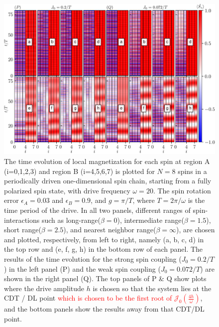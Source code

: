 \documentclass[12pt]{iopart}
\newcommand{\red}[1]{\textcolor{red}{#1}}
\begin{document}
\begin{figure}[t!]
    \centering
    \hspace{2cm}\includegraphics[width=13.5cm]{figure4.pdf}
    \caption{The time evolution of local magnetization for each spin at region A (i=0,1,2,3) and region B (i=4,5,6,7) is plotted for $N=8$ spins in a periodically driven one-dimensional spin chain, starting from a fully polarized spin state, with drive frequency $\omega=20$. The spin rotation error $\epsilon_A = 0.03$ and $\epsilon_B = 0.9$, and $g=\pi/T$, where $T=2\pi/\omega$ is the time period of the drive.  In all two panels, different ranges of spin-interactions such as long-range($\beta=0$), intermediate range($\beta=1.5$), short range($\beta=2.5$), and nearest neighbor range($\beta=\infty$), are chosen and plotted, respectively, from left to right, namely (a, b, c, d) in the top row and (e, f, g, h) in the bottom row of each panel. The results of the time evolution for the strong spin coupling ($J_0 = 0.2/T$) in the left panel (P) and the weak spin coupling ($J_0 = 0.072/T$) are shown in the right panel (Q). The top panels of P \& Q show plots where the drive amplitude $h$ is chosen so that the system lies at the CDT / DL point \red{which is chosen to be the first root of $\mathcal{J}_0\left(\frac{4h}{\omega}\right)$}, and the bottom panels show the results away from that CDT/DL point.}
    \label{Fig:strong_weak_ea}
\end{figure}
\end{document}
